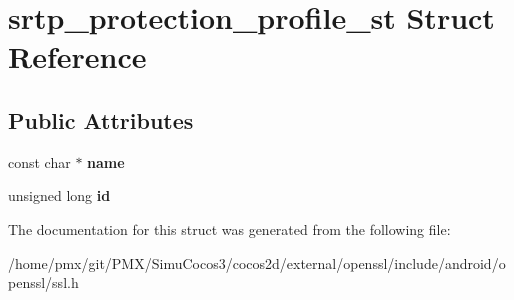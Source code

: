\hypertarget{structsrtp__protection__profile__st}{}\section{srtp\+\_\+protection\+\_\+profile\+\_\+st Struct Reference}
\label{structsrtp__protection__profile__st}
\subsection*{Public Attributes}
\begin{DoxyCompactItemize}
\item 
\mbox{\label{structsrtp__protection__profile__st_a468d73c456c93e3a2c53abe635881436}} 
const char $\ast$ {\bfseries name}
\item 
\mbox{\label{structsrtp__protection__profile__st_a8befcbb11f8a31c6a75e8d44e5618a00}} 
unsigned long {\bfseries id}
\end{DoxyCompactItemize}


The documentation for this struct was generated from the following file\+:\begin{DoxyCompactItemize}
\item 
/home/pmx/git/\+P\+M\+X/\+Simu\+Cocos3/cocos2d/external/openssl/include/android/openssl/ssl.\+h\end{DoxyCompactItemize}
